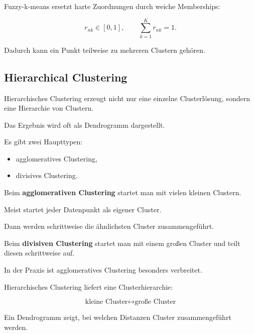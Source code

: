 \documentclass[11pt,a4paper]{scrartcl}
\begin{document}
\begin{answerbox}
    Fuzzy-k-means ersetzt harte Zuordnungen durch weiche Memberships:

    \[
        \boxed{
            r_{nk}\in[0,1],
            \qquad
            \sum_{k=1}^{K}r_{nk}=1.
        }
    \]

    Dadurch kann ein Punkt teilweise zu mehreren Clustern gehören.
\end{answerbox}

\subsection{Hierarchical Clustering}

\begin{notebox}
    Hierarchisches Clustering erzeugt nicht nur eine einzelne Clusterlösung,
    sondern eine Hierarchie von Clustern.

    Das Ergebnis wird oft als Dendrogramm dargestellt.

    Es gibt zwei Haupttypen:

    \begin{itemize}
        \item agglomeratives Clustering,
        \item divisives Clustering.
    \end{itemize}
\end{notebox}

\begin{solutionbox}
    Beim \textbf{agglomerativen Clustering} startet man mit vielen kleinen
    Clustern.

    Meist startet jeder Datenpunkt als eigener Cluster.

    Dann werden schrittweise die ähnlichsten Cluster zusammengeführt.

    Beim \textbf{divisiven Clustering} startet man mit einem großen Cluster und
    teilt diesen schrittweise auf.

    In der Praxis ist agglomeratives Clustering besonders verbreitet.
\end{solutionbox}

\begin{answerbox}
    Hierarchisches Clustering liefert eine Clusterhierarchie:

    \[
        \boxed{
            \text{kleine Cluster}
            \longleftrightarrow
            \text{große Cluster}
        }
    \]

    Ein Dendrogramm zeigt, bei welchen Distanzen Cluster zusammengeführt werden.
\end{answerbox}
\end{document}
